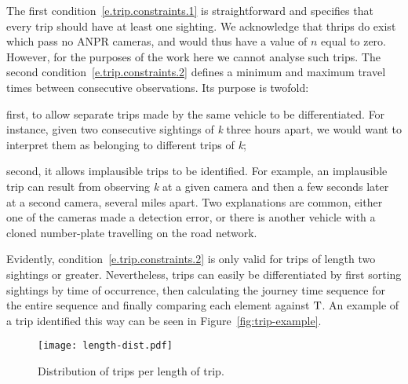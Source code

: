 The first condition~\ref{e.trip.constraints.1} is straightforward and specifies that every trip should have at least one sighting. We acknowledge that thrips do exist which pass no ANPR cameras, and would thus have a value of $n$ equal to zero. However, for the purposes of the work here we cannot analyse such trips. The second condition~\ref{e.trip.constraints.2} defines a minimum and maximum travel times between consecutive observations. Its purpose is twofold:
\begin{enumerate*}[label=(\roman*)]
  \item first, to allow separate trips made by the same vehicle to be differentiated. For instance, given two consecutive sightings of \emph{k} three hours apart, we would want to interpret them as belonging to different trips of \emph{k};
  \item second, it allows implausible trips to be identified. For example, an implausible trip can result from observing \emph{k} at a given camera and then a few seconds later at a second camera, several miles apart. Two explanations are common, either one of the cameras made a detection error, or there is another vehicle with a cloned number-plate travelling on the road network.
\end{enumerate*} Evidently, condition~\ref{e.trip.constraints.2} is only valid for trips of length two sightings or greater. Nevertheless, trips can easily be differentiated by first sorting sightings by time of occurrence, then calculating the journey time sequence for the entire sequence and finally comparing each element against $\mathrm{T}$. An example of a trip identified this way can be seen in Figure~\ref{fig:trip-example}.

\begin{figure}[t]
  \centering
  \texttt{[image: length-dist.pdf]}
  \caption{Distribution of trips per length of trip.}
  \label{fig:length-dist}
\end{figure}

